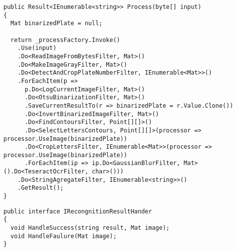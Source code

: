 \begin{lstlisting}[style=fsharpstyle,caption={Использование реализации каналы и фильтры},label=lst:pipe_and_filters_results]
public Result<IEnumerable<string>> Process(byte[] input)
{
  Mat binarizedPlate = null;

  return _processFactory.Invoke()
    .Use(input)
    .Do<ReadImageFromBytesFilter, Mat>()
    .Do<MakeImageGrayFilter, Mat>()
    .Do<DetectAndCropPlateNumberFilter, IEnumerable<Mat>>()
    .ForEachItem(p => 
      p.Do<LogCurrentImageFilter, Mat>()
      .Do<OtsuBinarizationFilter, Mat>()
      .SaveCurrentResultTo(r => binarizedPlate = r.Value.Clone())
      .Do<InvertBinarizedImageFilter, Mat>()
      .Do<FindContoursFilter, Point[][]>()
      .Do<SelectLettersContours, Point[][]>(processor => processor.UseImage(binarizedPlate))
      .Do<CropLettersFilter, IEnumerable<Mat>>(processor => processor.UseImage(binarizedPlate))
      .ForEachItem(ip => ip.Do<GaussianBlurFilter, Mat>().Do<TeseractOcrFilter, char>()))
    .Do<StringAgregateFilter, IEnumerable<string>>()
    .GetResult();
}
\end{lstlisting}

\begin{lstlisting}[style=fsharpstyle,caption={Определение интерфейса IRecongnitionResultHander}, label=lst:recognition_result_handler]
public interface IRecongnitionResultHander
{
  void HandleSuccess(string result, Mat image);
  void HandleFaulure(Mat image);
}
\end{lstlisting}

